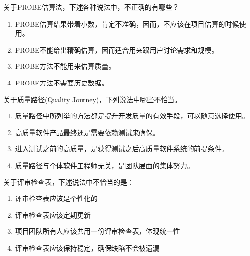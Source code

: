 \begin{problem}
	关于PROBE估算法，下述各种说法中，不正确的有哪些？
        \begin{enumerate}[label=\Alph*.]
            \item PROBE估算结果带着小数，肯定不准确，因而，不应该在项目估算的时候使用。
            \item PROBE不能给出精确估算，因而适合用来跟用户讨论需求和规模。
            \item PROBE方法不能用来估算质量。
            \item PROBE方法不需要历史数据。
        \end{enumerate}
\end{problem}



\begin{problem}
	关于质量路径(Quality Journey)，下列说法中哪些不恰当。
        \begin{enumerate}[label=\Alph*.]
            \item 质量路径中所列举的方法都是提升开发质量的有效手段，可以随意选择使用。
            \item 高质量软件产品最终还是需要依赖测试来确保。
            \item 进入测试之前的高质量，是获得测试之后高质量软件系统的前提条件。
            \item 质量路径与个体软件工程师无关，是团队层面的集体努力。
        \end{enumerate}
\end{problem}



\begin{problem}
	关于评审检查表，下述说法中不恰当的是：
        \begin{enumerate}[label=\Alph*.]
            \item 评审检查表应该是个性化的
            \item 评审检查表应该定期更新
            \item 项目团队所有人应该共用一份评审检查表，体现统一性
            \item 评审检查表应该保持稳定，确保缺陷不会被遗漏
        \end{enumerate}
\end{problem}



